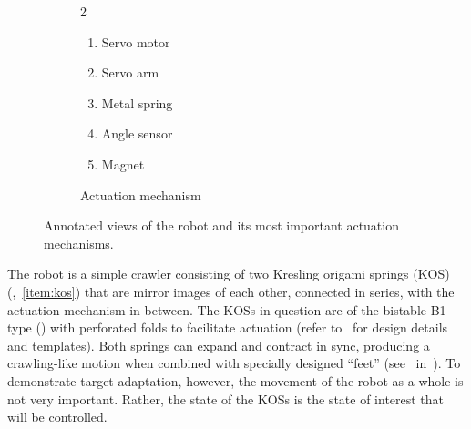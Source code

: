 \begin{figure}
\begin{subfigure}[b]{\linewidth}
\begin{multicols}{2}
            \begin{enumerate}
                \setcounter{enumi}{\value{annotations}}
                \item Servo motor   \label{item:servo}
                \item Servo arm     \label{item:servo-arm}
                \item Metal spring  \label{item:spring}
                \item Angle sensor  \label{item:sensor}
                \item Magnet        \label{item:magnet}
            \end{enumerate}
        \end{multicols}
        \vspace*{-1em}
        \caption{Actuation mechanism}
        \label{fig:nomen-actuation}
    \end{subfigure}
    \caption{Annotated views of the robot and its most important actuation mechanisms.}
    \label{fig:robot-overview}
\end{figure}

The robot is a simple crawler consisting of two Kresling origami springs (KOS) (,~\cref{item:kos}) that are mirror images of each other, connected in series, with the actuation mechanism in between.
The KOSs in question are of the bistable B1 type () with perforated folds to facilitate actuation (refer to~ for design details and templates).
Both springs can expand and contract in sync, producing a crawling-like motion when combined with specially designed ``feet'' (see~ in~).
To demonstrate target adaptation, however, the movement of the robot as a whole is not very important.
Rather, the state of the KOSs is the state of interest that will be controlled.

